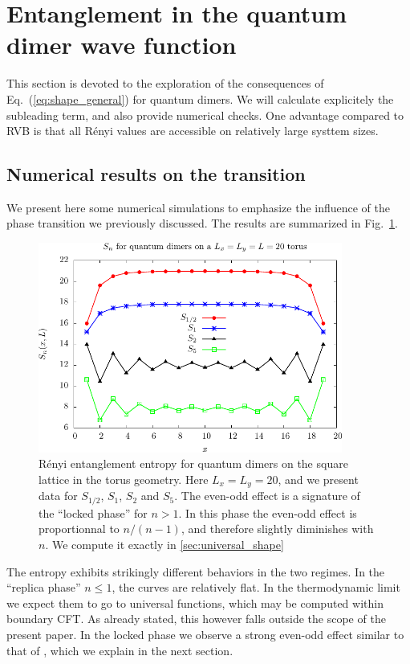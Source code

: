 \documentclass[11pt]{iopart}
\begin{document}
\section{Entanglement in the quantum dimer wave function}
\label{sec:dimers_entanglement}
This section is devoted to the exploration of the consequences of Eq.~(\ref{eq:shape_general}) for quantum dimers. We will calculate explicitely the subleading term, and also provide numerical checks. One advantage compared to RVB is that all R\'enyi values are accessible on relatively large systtem sizes.
\subsection{Numerical results on the transition}
We present here some numerical simulations to emphasize the influence of the phase transition we previously discussed. The results are summarized in Fig.~\ref{fig:ee_d_torus}. 
\begin{figure}[ht]
 \begin{center}
 \includegraphics[width=10cm]{./figures/ee_d_torus.pdf}
 \end{center}
\caption{R\'enyi entanglement entropy for quantum dimers on the square lattice in the torus geometry. Here $L_x=L_y=20$, and we present data for $S_{1/2}$, $S_1$, $S_2$ and $S_5$. The even-odd effect is a signature of the ``locked phase'' for $n>1$. In this phase the even-odd effect is proportionnal to $n/(n-1)$, and therefore slightly diminishes with $n$. We compute it exactly in \ref{sec:universal_shape}}
\label{fig:ee_d_torus}
\end{figure}
The entropy exhibits strikingly different behaviors in the two regimes. In the ``replica phase'' $n \leq 1$, the curves are relatively flat. In the thermodynamic limit we expect them to go to universal functions, which may be computed within boundary CFT. As already stated, this however falls outside the scope of the present paper. In the locked phase we observe a strong even-odd effect similar to that of \cite{Ju2012}, which we explain in the next section. 
\end{document}
